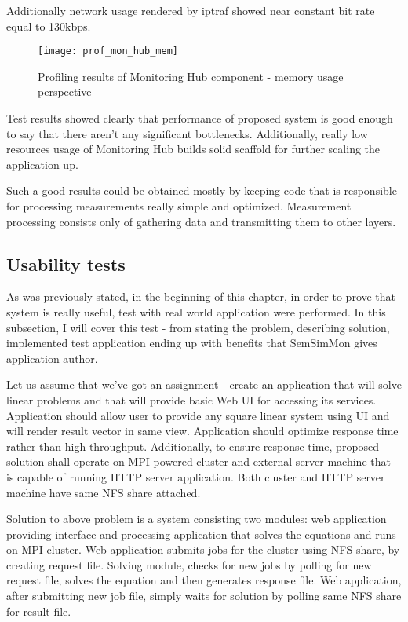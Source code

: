 Additionally network usage rendered by iptraf showed near constant bit rate equal to 130kbps.
\begin{figure}[ht]
\centering
\texttt{[image: prof\_mon\_hub\_mem]}
\caption{Profiling results of Monitoring Hub component - memory usage perspective}
\label{fig:prof_mon_hub_mem}
\end{figure}

Test results showed clearly that performance of proposed system is good enough to say that there aren\rq{}t any significant bottlenecks. Additionally, really low resources usage of Monitoring Hub builds solid scaffold for further scaling the application up.

Such a good results could be obtained mostly by keeping code that is responsible for processing measurements really simple and optimized. Measurement processing consists only of gathering data and transmitting them to other layers.

\subsection{Usability tests}

As was previously stated, in the beginning of this chapter, in order to prove that system is really useful, test with real world application were performed. In this subsection, I will cover this test - from stating the problem, describing solution, implemented test application ending up with benefits that SemSimMon gives application author.

Let us assume that we\rq{}ve got an assignment - create an application that will solve linear problems and that will provide basic Web UI for accessing its services. Application should allow user to provide any square linear system using UI and will render result vector in same view. Application should optimize response time rather than high throughput. Additionally, to ensure response time, proposed solution shall operate on MPI-powered cluster and external server machine that is capable of running HTTP server application. Both cluster and HTTP server machine have same NFS share attached. 

Solution to above problem is a system consisting two modules: web application providing interface and processing application that solves the equations and runs on MPI cluster. Web application submits jobs for the cluster using NFS share, by creating request file. Solving module, checks for new jobs by polling for new request file, solves the equation and then generates response file. Web application, after submitting new job file, simply waits for solution by polling same NFS share for result file. 

